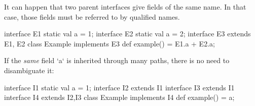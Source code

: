 It can happen that two parent interfaces give fields of the same name.  In
that case, those fields must be referred to by qualified names.
%
\begin{xten}
interface E1 {static val a = 1;}
interface E2 {static val a = 2;}
interface E3 extends E1, E2{}
class Example implements E3 {
  def example() = E1.a + E2.a;
}
\end{xten}
%

If the {\em same} field \xcd`a` is inherited through many paths, there is no need to
disambiguate it:
\begin{xten}
interface I1 { static val a = 1;} 
interface I2 extends I1 {}
interface I3 extends I1 {}
interface I4 extends I2,I3 {}
class Example implements I4 {
  def example() = a;
}
\end{xten}
%



